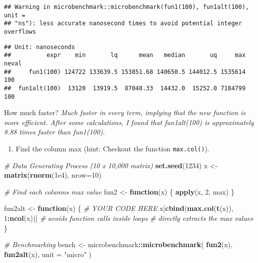 \documentclass[
]{article}
\newenvironment{Shaded}{\begin{snugshade}}{\end{snugshade}}
\newcommand{\AttributeTok}[1]{\textcolor[rgb]{0.13,0.29,0.53}{#1}}
\newcommand{\CommentTok}[1]{\textcolor[rgb]{0.56,0.35,0.01}{\textit{#1}}}
\newcommand{\ControlFlowTok}[1]{\textcolor[rgb]{0.13,0.29,0.53}{\textbf{#1}}}
\newcommand{\DecValTok}[1]{\textcolor[rgb]{0.00,0.00,0.81}{#1}}
\newcommand{\FloatTok}[1]{\textcolor[rgb]{0.00,0.00,0.81}{#1}}
\newcommand{\FunctionTok}[1]{\textcolor[rgb]{0.13,0.29,0.53}{\textbf{#1}}}
\newcommand{\NormalTok}[1]{#1}
\newcommand{\OtherTok}[1]{\textcolor[rgb]{0.56,0.35,0.01}{#1}}
\newcommand{\SpecialCharTok}[1]{\textcolor[rgb]{0.81,0.36,0.00}{\textbf{#1}}}
\newcommand{\StringTok}[1]{\textcolor[rgb]{0.31,0.60,0.02}{#1}}
\providecommand{\tightlist}{%
  \setlength{\itemsep}{0pt}\setlength{\parskip}{0pt}}
\begin{document}
\begin{verbatim}
## Warning in microbenchmark::microbenchmark(fun1(100), fun1alt(100), unit =
## "ns"): less accurate nanosecond times to avoid potential integer overflows
\end{verbatim}

\begin{verbatim}
## Unit: nanoseconds
##          expr    min       lq      mean   median       uq     max neval
##     fun1(100) 124722 133639.5 153851.68 140650.5 144012.5 1535614   100
##  fun1alt(100)  13120  13919.5  87048.33  14432.0  15252.0 7184799   100
\end{verbatim}

How much faster? \emph{Much faster in every term, implying that the new
function is more efficient. After some calculations, I found that
fun1alt(100) is approximately 8.88 times faster than fun1(100).}

\begin{enumerate}
\def\labelenumi{\arabic{enumi}.}
\setcounter{enumi}{1}
\tightlist
\item
  Find the column max (hint: Checkout the function \texttt{max.col()}).
\end{enumerate}

\begin{Shaded}
\begin{Highlighting}[]
\CommentTok{\# Data Generating Process (10 x 10,000 matrix)}
\FunctionTok{set.seed}\NormalTok{(}\DecValTok{1234}\NormalTok{)}
\NormalTok{x }\OtherTok{\textless{}{-}} \FunctionTok{matrix}\NormalTok{(}\FunctionTok{rnorm}\NormalTok{(}\FloatTok{1e4}\NormalTok{), }\AttributeTok{nrow=}\DecValTok{10}\NormalTok{)}

\CommentTok{\# Find each column\textquotesingle{}s max value}
\NormalTok{fun2 }\OtherTok{\textless{}{-}} \ControlFlowTok{function}\NormalTok{(x) \{}
  \FunctionTok{apply}\NormalTok{(x, }\DecValTok{2}\NormalTok{, max)}
\NormalTok{\}}

\NormalTok{fun2alt }\OtherTok{\textless{}{-}} \ControlFlowTok{function}\NormalTok{(x) \{}
  \CommentTok{\# YOUR CODE HERE}
\NormalTok{  x[}\FunctionTok{cbind}\NormalTok{(}\FunctionTok{max.col}\NormalTok{(}\FunctionTok{t}\NormalTok{(x)), }\DecValTok{1}\SpecialCharTok{:}\FunctionTok{ncol}\NormalTok{(x))]}
  \CommentTok{\# avoids function calls inside loops}
  \CommentTok{\# directly extracts the max values }
\NormalTok{\}}

\CommentTok{\# Benchmarking}
\NormalTok{bench }\OtherTok{\textless{}{-}}\NormalTok{ microbenchmark}\SpecialCharTok{::}\FunctionTok{microbenchmark}\NormalTok{(}
  \FunctionTok{fun2}\NormalTok{(x),}
  \FunctionTok{fun2alt}\NormalTok{(x),}
  \AttributeTok{unit =} \StringTok{"micro"}
\NormalTok{)}
\end{Highlighting}
\end{Shaded}
\end{document}
